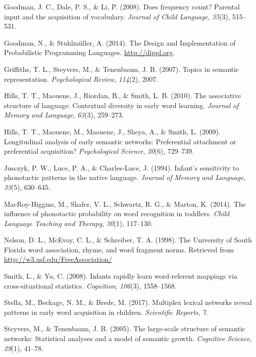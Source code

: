 \documentclass[10pt, letterpaper]{article}
\begin{document}
\hypertarget{ref-goodman2008}{}
Goodman, J. C., Dale, P. S., \& Li, P. (2008). Does frequency count?
Parental input and the acquisition of vocabulary. \emph{Journal of Child
Language}, \emph{35}(3), 515--531.

\hypertarget{ref-dippl}{}
Goodman, N., \& Stuhlmüller, A. (2014). The Design and Implementation of
Probabilistic Programming Languages. \url{http://dippl.org}.

\hypertarget{ref-griffiths07}{}
Griffiths, T. L., Steyvers, M., \& Tenenbaum, J. B. (2007). Topics in
semantic representation. \emph{Psychological Review}, \emph{114}(2),
2007.

\hypertarget{ref-hills2010}{}
Hills, T. T., Maouene, J., Riordan, B., \& Smith, L. B. (2010). The
associative structure of language: Contextual diversity in early word
learning. \emph{Journal of Memory and Language}, \emph{63}(3), 259--273.

\hypertarget{ref-hills2009}{}
Hills, T. T., Maouene, M., Maouene, J., Sheya, A., \& Smith, L. (2009).
Longitudinal analysis of early semantic networks: Preferential
attachment or preferential acquisition? \emph{Psychological Science},
\emph{20}(6), 729--739.

\hypertarget{ref-jusczyk1994}{}
Jusczyk, P. W., Luce, P. A., \& Charles-Luce, J. (1994). Infant's
sensitivity to phonotactic patterns in the native language.
\emph{Journal of Memory and Language}, \emph{33}(5), 630--645.

\hypertarget{ref-higgins2014}{}
MacRoy-Higgins, M., Shafer, V. L., Schwartz, R. G., \& Marton, K.
(2014). The influence of phonotactic probability on word recognition in
toddlers. \emph{Child Language Teaching and Therapy}, \emph{30}(1),
117--130.

\hypertarget{ref-nelson1998}{}
Nelson, D. L., McEvoy, C. L., \& Schreiber, T. A. (1998). The University
of South Florida word association, rhyme, and word fragment norms.
Retrieved from \url{http://w3.usf.edu/FreeAssociation/}

\hypertarget{ref-smith2008}{}
Smith, L., \& Yu, C. (2008). Infants rapidly learn word-referent
mappings via cross-situational statistics. \emph{Cognition},
\emph{106}(3), 1558--1568.

\hypertarget{ref-stella2017}{}
Stella, M., Beckage, N. M., \& Brede, M. (2017). Multiplex lexical
networks reveal patterns in early word acquisition in children.
\emph{Scientific Reports}, \emph{7}.

\hypertarget{ref-steyvers2005}{}
Steyvers, M., \& Tenenbaum, J. B. (2005). The large-scale structure of
semantic networks: Statistical analyses and a model of semantic growth.
\emph{Cognitive Science}, \emph{29}(1), 41--78.
\end{document}
